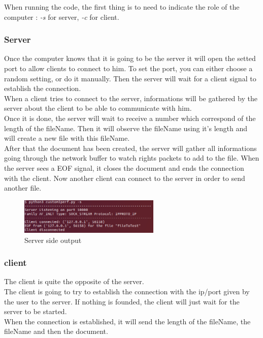 \documentclass[a4paper]{article}
\begin{document}
When running the code, the first thing is to need to indicate the role of the computer : \textit{-s} for server, \textit{-c} for client.

\subsubsection*{Server}

Once the computer knows that it is going to be the server it will open the setted port to allow clients to connect to him. To set the port, you can either choose a random setting, or do it manually. Then the server will wait for a client signal to establish the connection.\\
When a client tries to connect to the server, informations will be gathered by the server about the client to be able to communicate with him.\\
 Once it is done, the server will wait to receive a number which correspond of the length of the fileName. Then it will observe the fileName using it's length and will create a new file with this fileName.\\
After that the document has been created, the server will gather all informations going through the network buffer to watch rights packets to add to the file. When the server sees a EOF signal, it closes the document and ends the connection with the client.
Now another client can connect to the server in order to send another file.

\begin{figure}[H]
\centering
\includegraphics[width=0.6\textwidth]{serverSide.png}
\caption{Server side output}
\end{figure}

\subsubsection*{client}

The client is quite the opposite of the server.\\
The client is going to try to establish the connection with the ip/port given by the user to the server. If nothing is founded, the client will just wait for the server to be started.\\
When the connection is established, it will send the length of the fileName, the fileName and then the document.
\end{document}
